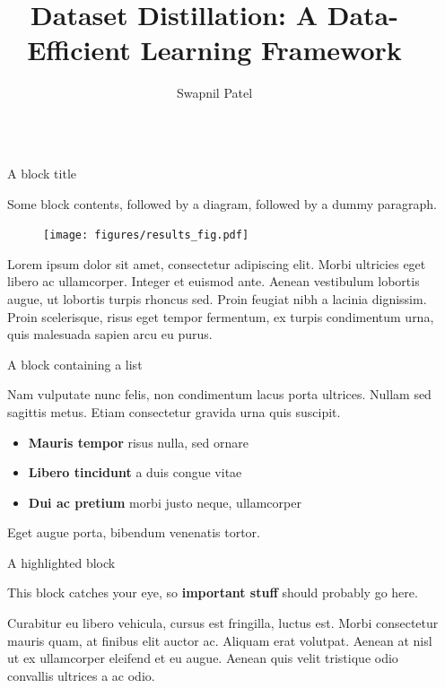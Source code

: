 \documentclass[final]{beamer}
\title{Dataset Distillation: A Data-Efficient Learning Framework}
\author{Swapnil Patel}
\institute[shortinst]{University of Toronto}
\newlength{\sepwidth}
\newlength{\colwidth}
\newcommand{\separatorcolumn}{\begin{column}{\sepwidth}\end{column}}
\begin{document}
	
	
	
	\begin{frame}[t]
		\begin{columns}[t]
			\separatorcolumn
			
			\begin{column}{\colwidth}
				
				\begin{block}{A block title}
					
					Some block contents, followed by a diagram, followed by a dummy paragraph.
					
					\begin{figure}
						\centering
						\texttt{[image: figures/results\_fig.pdf]}
					\end{figure}
					
					Lorem ipsum dolor sit amet, consectetur adipiscing elit. Morbi ultricies
					eget libero ac ullamcorper. Integer et euismod ante. Aenean vestibulum
					lobortis augue, ut lobortis turpis rhoncus sed. Proin feugiat nibh a
					lacinia dignissim. Proin scelerisque, risus eget tempor fermentum, ex
					turpis condimentum urna, quis malesuada sapien arcu eu purus.
					
				\end{block}
				
				\begin{block}{A block containing a list}
					
					Nam vulputate nunc felis, non condimentum lacus porta ultrices. Nullam sed
					sagittis metus. Etiam consectetur gravida urna quis suscipit.
					
					\begin{itemize}
						\item \textbf{Mauris tempor} risus nulla, sed ornare
						\item \textbf{Libero tincidunt} a duis congue vitae
						\item \textbf{Dui ac pretium} morbi justo neque, ullamcorper
					\end{itemize}
					
					Eget augue porta, bibendum venenatis tortor.
					
				\end{block}
				
				\begin{alertblock}{A highlighted block}
					
					This block catches your eye, so \textbf{important stuff} should probably go
					here.
					
					Curabitur eu libero vehicula, cursus est fringilla, luctus est. Morbi
					consectetur mauris quam, at finibus elit auctor ac. Aliquam erat volutpat.
					Aenean at nisl ut ex ullamcorper eleifend et eu augue. Aenean quis velit
					tristique odio convallis ultrices a ac odio.
					

\end{alertblock}
\end{column}
\end{columns}
\end{frame}
\end{document}

